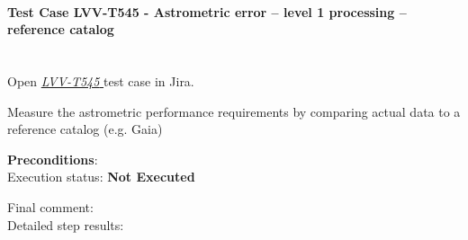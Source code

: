 \documentclass[DM,lsstdraft,STR,toc]{lsstdoc}
\begin{document}
    \paragraph{Test Case LVV-T545 - Astrometric error -- level 1 processing -- reference catalog
 }\mbox{}\\

Open  \href{https://jira.lsstcorp.org/secure/Tests.jspa#/testCase/LVV-T545}{\textit{ LVV-T545 } }
test case in Jira.

    Measure the astrometric performance requirements by comparing actual
data to a reference catalog (e.g. Gaia)


    \textbf{ Preconditions}:\\
    

    Execution status: {\bf Not Executed }

    Final comment:\\


    Detailed step results:
\end{document}
